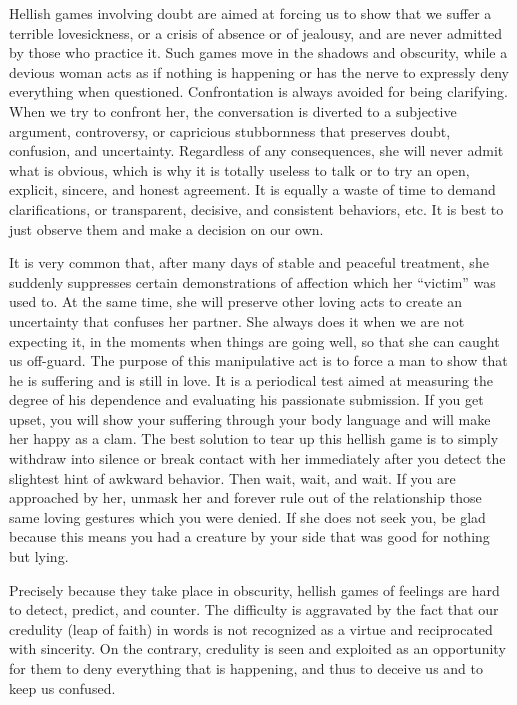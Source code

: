 \par Hellish games involving doubt are aimed at forcing us to show that we suffer a terrible lovesickness, or a crisis of absence or of jealousy, and are never admitted by those who practice it. Such games move in the shadows and obscurity, while a devious woman acts as if nothing is happening or has the nerve to expressly deny everything when questioned. Confrontation is always avoided for being clarifying. When we try to confront her, the conversation is diverted to a subjective argument, controversy, or capricious stubbornness that preserves doubt, confusion, and uncertainty. Regardless of any consequences, she will never admit what is obvious, which is why it is totally useless to talk or to try an open, explicit, sincere, and honest agreement. It is equally a waste of time to demand clarifications, or transparent, decisive, and consistent behaviors, etc. It is best to just observe them and make a decision on our own.

\par It is very common that, after many days of stable and peaceful treatment, she suddenly suppresses certain demonstrations of affection which her \enquote{victim} was used to. At the same time, she will preserve other loving acts to create an uncertainty that confuses her partner. She always does it when we are not expecting it, in the moments when things are going well, so that she can caught us off-guard. The purpose of this manipulative act is to force a man to show that he is suffering and is still in love. It is a periodical test aimed at measuring the degree of his dependence and evaluating his passionate submission. If you get upset, you will show your suffering through your body language and will make her happy as a clam. The best solution to tear up this hellish game is to simply withdraw into silence or break contact with her immediately after you detect the slightest hint of awkward behavior. Then wait, wait, and wait. If you are approached by her, unmask her and forever rule out of the relationship those same loving gestures which you were denied. If she does not seek you, be glad because this means you had a creature by your side that was good for nothing but lying.

\par Precisely because they take place in obscurity, hellish games of feelings are hard to detect, predict, and counter. The difficulty is aggravated by the fact that our credulity (leap of faith) in words is not recognized as a virtue and reciprocated with sincerity. On the contrary, credulity is seen and exploited as an opportunity for them to deny everything that is happening, and thus to deceive us and to keep us confused.

